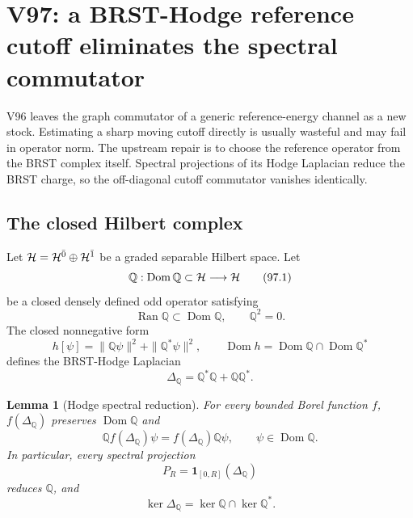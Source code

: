 \documentclass[11pt]{article}
\newtheorem{lemma}[theorem]{Lemma}
\theoremstyle{remark}
\begin{document}


\section{V97: a BRST-Hodge reference cutoff eliminates the spectral
commutator}
\label{sec:v12v97}

V96 leaves the graph commutator of a generic reference-energy
channel as a new stock.  Estimating a sharp moving cutoff directly
is usually wasteful and may fail in operator norm.  The upstream
repair is to choose the reference operator from the BRST complex
itself.  Spectral projections of its Hodge Laplacian reduce the BRST
charge, so the off-diagonal cutoff commutator vanishes identically.

\subsection{The closed Hilbert complex}

Let \({\cal H}={\cal H}^{\bar0}\oplus{\cal H}^{\bar1}\) be a graded
separable Hilbert space.  Let
\[
 {\mathbb Q}:\operatorname{Dom}{\mathbb Q}\subset{\cal H}
 \longrightarrow{\cal H}                                      \tag{97.1}
\]
be a closed densely defined odd operator satisfying
\[
 \operatorname{Ran}{\mathbb Q}\subset\operatorname{Dom}{\mathbb Q},
 \qquad {\mathbb Q}^2=0.                                       \tag{97.2}
\]
The closed nonnegative form
\[
 h[\psi]=\|{\mathbb Q}\psi\|^2+\|{\mathbb Q}^*\psi\|^2,
 \qquad
 \operatorname{Dom}h=
 \operatorname{Dom}{\mathbb Q}\cap
 \operatorname{Dom}{\mathbb Q}^*                               \tag{97.3}
\]
defines the BRST-Hodge Laplacian
\[
 \Delta_{\mathbb Q}
 ={\mathbb Q}^*{\mathbb Q}+{\mathbb Q}{\mathbb Q}^*.             \tag{97.4}
\]

\begin{lemma}[Hodge spectral reduction]
\label{lem:v12v97-hodge}
For every bounded Borel function \(f\),
\(f(\Delta_{\mathbb Q})\) preserves
\(\operatorname{Dom}{\mathbb Q}\) and
\[
 {\mathbb Q}f(\Delta_{\mathbb Q})\psi
 =
 f(\Delta_{\mathbb Q}){\mathbb Q}\psi,
 \qquad \psi\in\operatorname{Dom}{\mathbb Q}.                   \tag{97.5}
\]
In particular, every spectral projection
\[
 P_R=\mathbf1_{[0,R]}(\Delta_{\mathbb Q})                        \tag{97.6}
\]
reduces \({\mathbb Q}\), and
\[
 \ker\Delta_{\mathbb Q}
 =\ker{\mathbb Q}\cap\ker{\mathbb Q}^*.                         \tag{97.7}
\]
\end{lemma}
\end{document}
